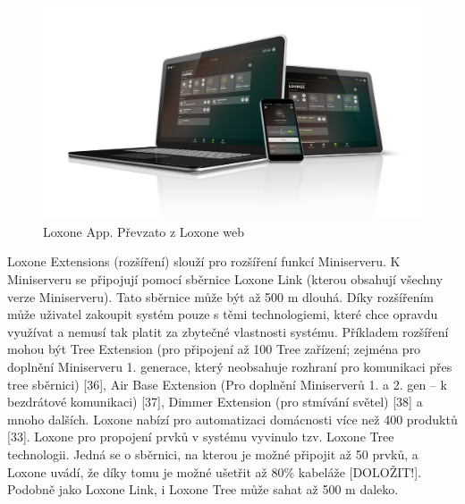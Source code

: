 \begin{figure}[hbt]
	\centering
	\includegraphics{obrazky/loxone-app.jpg}
	\caption{Loxone App. Převzato z Loxone web}
	\label{loxone-app}
\end{figure}

Loxone Extensions (rozšíření) slouží pro rozšíření funkcí Miniserveru. K Miniserveru se připojují pomocí sběrnice Loxone Link (kterou obsahují všechny verze Miniserveru). Tato sběrnice může být až 500 m dlouhá. Díky rozšířením může uživatel zakoupit systém pouze s těmi technologiemi, které chce opravdu využívat a nemusí tak platit za zbytečné vlastnosti systému. Příkladem rozšíření mohou být Tree Extension (pro připojení až 100 Tree zařízení; zejména pro doplnění Miniserveru 1. generace, který neobsahuje rozhraní pro komunikaci přes tree sběrnici) [36], Air Base Extension (Pro doplnění Miniserverů 1. a 2. gen – k bezdrátové komunikaci) [37], Dimmer Extension (pro stmívání světel) [38] a mnoho dalších.\newline
Loxone nabízí pro automatizaci domácnosti více než 400 produktů [33].
Loxone pro propojení prvků v systému vyvinulo tzv. Loxone Tree technologii. Jedná se o sběrnici, na kterou je možné připojit až 50 prvků, a Loxone uvádí, že díky tomu je možné ušetřit až 80\% kabeláže [DOLOŽIT!]. Podobně jako Loxone Link, i Loxone Tree může sahat až 500 m daleko. \newline

